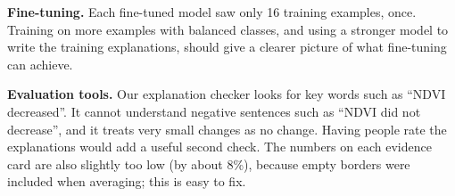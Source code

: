 \documentclass[11pt]{article}
\begin{document}
\textbf{Fine-tuning.} Each fine-tuned model saw only 16 training
examples, once. Training on more examples with balanced classes, and
using a stronger model to write the training explanations, should give
a clearer picture of what fine-tuning can achieve.

\textbf{Evaluation tools.} Our explanation checker looks for key words
such as ``NDVI decreased''. It cannot understand negative sentences
such as ``NDVI did not decrease'', and it treats very small changes as
no change. Having people rate the explanations would add a useful
second check. The numbers on each evidence card are also slightly too
low (by about 8\%), because empty borders were included when averaging;
this is easy to fix.

\end{document}
